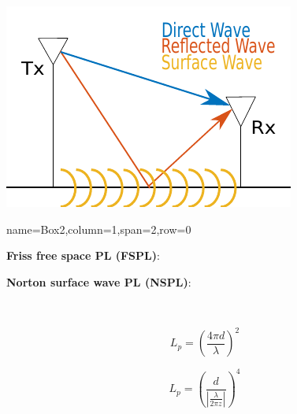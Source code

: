 \documentclass[a0paper,landscape]{baposter}
\begin{document}
\begin{poster}
{\begin{center}
\includegraphics[scale=0.8]{pix/poster_cropped.pdf}
\label{fig:name}
\end{center}

}




{name=Box2,column=1,span=2,row=0}{
\large

\begin{minipage}{.5\textwidth}
\textcolor{thomasred}{\textbf{Friss free space PL (FSPL)}:}
\end{minipage}%
\begin{minipage}{0.5\textwidth}
\textcolor{thomasyellow}{\textbf{Norton surface wave PL (NSPL)}:}
\end{minipage} \\

\begin{minipage}{.5\textwidth}
\begin{equation*}
L_p=\left(\frac{4 \pi d}{\lambda}\right)^2
\label{simple_friss}
\end{equation*} 
\end{minipage}%
\begin{minipage}{0.5\textwidth}
\begin{equation*}
L_p=\left(\frac{d}{\left|\frac{\lambda}{2\pi z}\right|}\right)^4
\label{surface_wave}
\end{equation*}
\end{minipage} \\

}
\end{poster}
\end{document}
